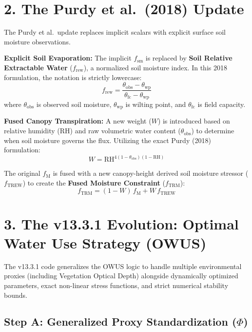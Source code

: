 \documentclass[11pt]{article}
\begin{document}
\section*{2. The Purdy et al.~(2018) Update}

The Purdy et al.~update replaces implicit scalars with explicit surface soil moisture observations.

\textbf{Explicit Soil Evaporation:} The implicit $f_{\mathrm{sm}}$ is replaced by \textbf{Soil Relative Extractable Water} ($f_{\mathrm{rew}}$), a normalized soil moisture index. In this 2018 formulation, the notation is strictly lowercase:
\begin{equation}
  f_{\mathrm{rew}} = \frac{\theta_{\mathrm{obs}} - \theta_{\mathrm{wp}}}{\theta_{\mathrm{fc}} - \theta_{\mathrm{wp}}}
\end{equation}
where $\theta_{\mathrm{obs}}$ is observed soil moisture, $\theta_{\mathrm{wp}}$ is wilting point, and $\theta_{\mathrm{fc}}$ is field capacity.

\textbf{Fused Canopy Transpiration:} A new weight ($W$) is introduced based on relative humidity ($\mathrm{RH}$) and raw volumetric water content ($\theta_{\mathrm{obs}}$) to determine when soil moisture governs the flux. Utilizing the exact Purdy (2018) formulation:
\begin{equation}
  W = \mathrm{RH}^{4(1-\theta_{\mathrm{obs}})(1-\mathrm{RH})}
\end{equation}

The original $f_{\mathrm{M}}$ is fused with a new canopy-height derived soil moisture stressor ($f_{\mathrm{TREW}}$) to create the \textbf{Fused Moisture Constraint} ($f_{\mathrm{TRM}}$):
\begin{equation}
  f_{\mathrm{TRM}} = (1-W)\,f_{\mathrm{M}} + W\,f_{\mathrm{TREW}}
\end{equation}

\section*{3. The v13.3.1 Evolution: Optimal Water Use Strategy (OWUS)}

The v13.3.1 code generalizes the OWUS logic to handle multiple environmental proxies (including Vegetation Optical Depth) alongside dynamically optimized parameters, exact non-linear stress functions, and strict numerical stability bounds.

\subsection*{Step A: Generalized Proxy Standardization ($\Phi$)}
\end{document}

